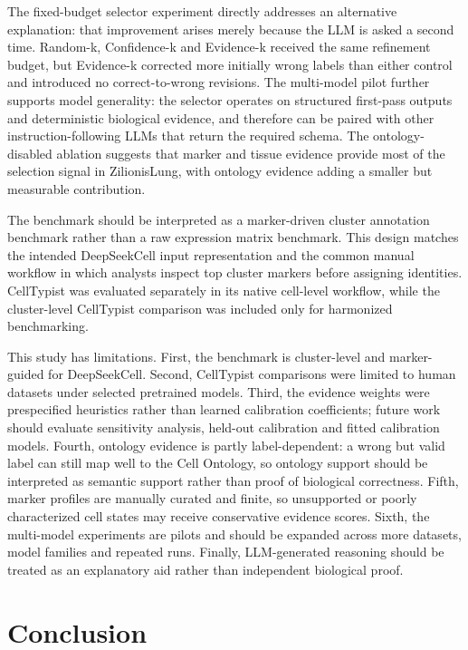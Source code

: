 \documentclass[unnumsec,webpdf,contemporary,large,numbered]{oup-authoring-template}
\begin{document}
The fixed-budget selector experiment directly addresses an alternative explanation: that improvement arises merely because the LLM is asked a second time. Random-k, Confidence-k and Evidence-k received the same refinement budget, but Evidence-k corrected more initially wrong labels than either control and introduced no correct-to-wrong revisions. The multi-model pilot further supports model generality: the selector operates on structured first-pass outputs and deterministic biological evidence, and therefore can be paired with other instruction-following LLMs that return the required schema. The ontology-disabled ablation suggests that marker and tissue evidence provide most of the selection signal in ZilionisLung, with ontology evidence adding a smaller but measurable contribution.

The benchmark should be interpreted as a marker-driven cluster annotation benchmark rather than a raw expression matrix benchmark. This design matches the intended DeepSeekCell input representation and the common manual workflow in which analysts inspect top cluster markers before assigning identities. CellTypist was evaluated separately in its native cell-level workflow, while the cluster-level CellTypist comparison was included only for harmonized benchmarking.

This study has limitations. First, the benchmark is cluster-level and marker-guided for DeepSeekCell. Second, CellTypist comparisons were limited to human datasets under selected pretrained models. Third, the evidence weights were prespecified heuristics rather than learned calibration coefficients; future work should evaluate sensitivity analysis, held-out calibration and fitted calibration models. Fourth, ontology evidence is partly label-dependent: a wrong but valid label can still map well to the Cell Ontology, so ontology support should be interpreted as semantic support rather than proof of biological correctness. Fifth, marker profiles are manually curated and finite, so unsupported or poorly characterized cell states may receive conservative evidence scores. Sixth, the multi-model experiments are pilots and should be expanded across more datasets, model families and repeated runs. Finally, LLM-generated reasoning should be treated as an explanatory aid rather than independent biological proof.

\section{Conclusion}
\end{document}
